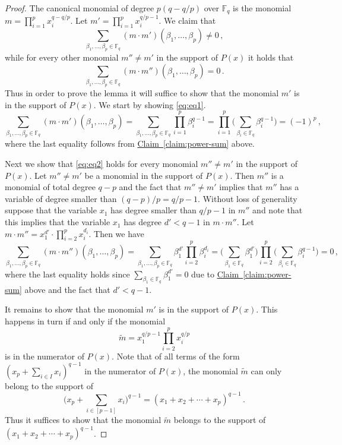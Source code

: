 \documentclass[10pt]{article}
\theoremstyle{definition}
\numberwithin{equation}{section}
\newcommand{\expref}[2]{\texorpdfstring{\hyperref[#2]{#1~\ref{#2}}}{#1~\ref{#2}}}
\newcommand{\F}{{\mathbb{F}}}
\begin{document}
\begin{proof}
The canonical monomial of degree $p(q-q/p)$ over $\F_q$ is the monomial $m = \prod_{i=1}^{p} x_i^{q-q/p}$. Let $m' = \prod_{i=1}^p x_i^{q/p-1}$.
We claim that
\begin{equation}\label{eq:eq1}
 \sum_{\beta_1,\ldots,\beta_p \in \F_q} (m \cdot m')(\beta_1,\ldots, \beta_p)  \neq 0\,,
 \end{equation}
 while for every other
monomial $m'' \neq m'$ in the support of
$P(x)$ it holds that
\begin{equation}\label{eq:eq2}
\sum_{\beta_1,\ldots,\beta_p \in \F_q}(m \cdot m'')(\beta_1,\ldots,\beta_p) =0\,.
\end{equation}
Thus in order to prove the lemma it will suffice to show that the monomial $m'$
is in the support of $P(x)$.
We start by showing \eqref{eq:eq1}. %
$$
\sum_{\beta_1,\ldots,\beta_p \in \F_q} (m \cdot m')(\beta_1,\ldots, \beta_p)   =  \sum_{\beta_1,\ldots,\beta_p \in \F_q}    \prod_{i=1}^{p} \beta_i^{q-1}
  = \prod_{i=1}^p \bigg( \sum_{\beta_i \in \F_q} \beta_i^{q-1} \bigg) =  (-1)^p  \,,
$$
where the last equality follows from \expref{Claim}{claim:power-sum} above.


Next we show that \eqref{eq:eq2} holds for every monomial $m'' \neq m'$ in the support of $P(x)$.
%
Let $m'' \neq m'$ be a monomial in the support of $P(x)$. Then
 $m''$ is a monomial of total degree $q-p$ and the fact that $m'' \neq m'$ implies that $m'' $ has a variable of degree smaller than
 $(q-p)/p = q/p - 1$. Without loss of generality suppose that the variable $x_1$ has degree smaller than  $q/p - 1$ in $m''$ and note that this implies
 that the variable $x_1$  has degree $d' < q-1$ in $m \cdot m''$. Let $m \cdot m'' = x_1^{d'} \cdot \prod_{i=2}^{p} x_i^{d_i}$. Then we have
%
%
%
%
\begin{equation*}
 \sum_{\beta_1,\ldots,\beta_p \in \F_q} (m \cdot m'')(\beta_1,\ldots, \beta_p)    =\sum_{\beta_1,\ldots,\beta_p \in \F_q}   \beta_1^{d'}  \prod_{i=2}^{p} \beta_i^{d_i} 
 =  \bigg(\sum_{\beta_1 \in \F_q} \beta_1^{d'} \bigg) \prod_{i=2}^p  \bigg(\sum_{\beta_i \in \F_q} \beta_i^{q-1} \bigg)= 0\,, 
\end{equation*}
where the last equality holds since $\sum_{\beta_1 \in \F_q} \beta_1^{d'}=0$ due to \expref{Claim}{claim:power-sum} above and the fact that $d' < q-1$.

%
%
 It remains to show that
the monomial $m'$ is in the support of $P(x)$. This happens in turn if
and only if the monomial
\[
{\widetilde m} = x_1^{q/p-1} \prod_{i=2}^p x_i^{q/p}
\]
is in the numerator of $P(x)$.
Note that of all terms of the form $(x_p + \sum_{i \in I}x_i)^{q-1}$ in the numerator of $P(x)$, the monomial $\widetilde m$
can only belong to the support of $$\bigg(x_p + \sum_{i \in [p-1]} x_i\bigg)^{q-1} = (x_1 + x_2 + \cdots + x_p)^{q-1}\,.$$ Thus it suffices
to show that the monomial $\widetilde m$ belongs to the support of $(x_1 + x_2 + \cdots + x_p)^{q-1}$.


\end{proof}
\end{document}
